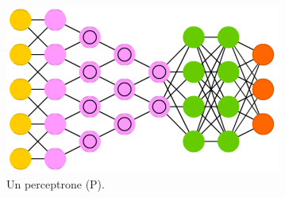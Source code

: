 \begin{figure}

\includegraphics[scale=0.7]{media_tesi/DCN.png}
\caption{Un perceptrone (P).}\label{wrap-fig:1}
\end{figure} 
